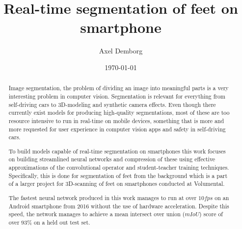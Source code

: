 \documentclass{kththesis}
\title{Real-time segmentation of feet on smartphone}
\author{Axel Demborg}
\date{\today}
\begin{document}
\listoftodos

\frontmatter

\titlepage

\begin{abstract}

  Image segmentation, the problem of dividing an image into meaningful parts is a
  very interesting problem in computer vision. Segmentation is relevant for
  everything from self-driving cars to 3D-modeling and synthetic camera effects.
  Even though there currently exist models for producing high-quality
  segmentations, most of these are too resource intensive to run in real-time on
  mobile devices, something that is more and more requested for user experience
  in computer vision apps and safety in self-driving cars.

  To build models capable of real-time segmentation on smartphones this work
  focuses on building streamlined neural networks and compression of these using
  effective approximations of the convolutional operator and student-teacher
  training techniques. Specifically, this is
  done for segmentation of feet from the background which is a part of a larger
  project for 3D-scanning of feet on smartphones conducted at Volumental.

  The fastest neural network produced in this work manages to run at over \(10
  fps\) on an Android smartphone from 2016 without the use of hardware
  acceleration. Despite this speed, the network manages to achieve a mean
  intersect over union (\(mIoU\)) score of over \(93\%\) on a held out test set.

\end{abstract}
\end{document}
